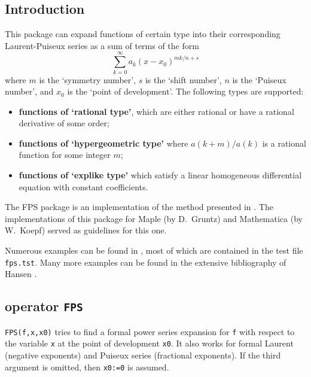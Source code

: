 
\subsection{Introduction}
This package can expand functions of certain type into
their corresponding Laurent-Puiseux series as a sum of terms of the form
\[
\sum_{k=0}^{\infty} a_{k} (x-x_{0})^{m k/n + s}
\]
where $m$ is the `symmetry number', $s$ is the `shift number',
$n$ is the `Puiseux number',
and $x_0$ is the `point of development'. The following types are
supported:
\begin{itemize}
\item
{\bf functions of `rational type'}, which are either rational or have a
rational derivative of some order;
\item
{\bf functions of `hypergeometric type'} where $a(k+m)/a(k)$ is a rational
function for some integer $m$;
\item
{\bf functions of `explike type'} which satisfy a linear homogeneous
differential equation with constant coefficients.
\end{itemize}

The FPS package is an implementation of the method
presented in \cite{Koepf:92}. The implementations of this package
for {\sc Maple} (by D.\ Gruntz) and {\sc Mathematica} (by W.\ Koepf)
served as guidelines for this one.

Numerous examples can be found in \cite{Koepf:93a,Koepf:93b}, 
most of which are contained in the test file {\tt fps.tst}. Many 
more examples can be found in the extensive bibliography of Hansen \cite{Hansen:75}.


\subsection{\REDUCE{} operator {\tt FPS}}

\hypertarget{operator:FPS}{}
{\tt FPS(f,x,x0)} tries to find a formal power
series expansion for {\tt f} with respect to the variable {\tt x} 
at the point of development {\tt x0}. 
It also works for formal Laurent (negative exponents) and Puiseux series
(fractional exponents). If the third 
argument is omitted, then {\tt x0:=0} is assumed.

